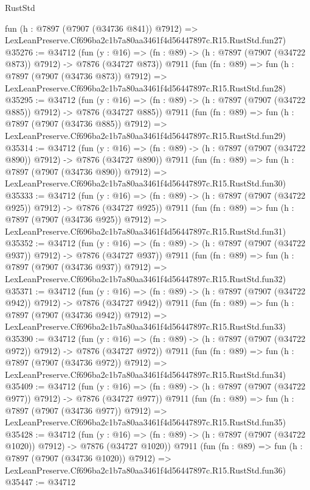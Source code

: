 \begin{lexlean}{RustStd}
\begin{coremodule}
    fun (h : @7897 (@7907 (@34736 @841)) @7912) =>
    LexLeanPreserve.Cf696ba2c1b7a80aa3461f4d56447897c.R15.RustStd.fun27)
@35276 := @34712
    (fun (y : @16) => (fn : @89) -> (h : @7897 (@7907 (@34722 @873)) @7912) -> @7876 (@34727 @873))
    @7911
    (fun (fn : @89) =>
    fun (h : @7897 (@7907 (@34736 @873)) @7912) =>
    LexLeanPreserve.Cf696ba2c1b7a80aa3461f4d56447897c.R15.RustStd.fun28)
@35295 := @34712
    (fun (y : @16) => (fn : @89) -> (h : @7897 (@7907 (@34722 @885)) @7912) -> @7876 (@34727 @885))
    @7911
    (fun (fn : @89) =>
    fun (h : @7897 (@7907 (@34736 @885)) @7912) =>
    LexLeanPreserve.Cf696ba2c1b7a80aa3461f4d56447897c.R15.RustStd.fun29)
@35314 := @34712
    (fun (y : @16) => (fn : @89) -> (h : @7897 (@7907 (@34722 @890)) @7912) -> @7876 (@34727 @890))
    @7911
    (fun (fn : @89) =>
    fun (h : @7897 (@7907 (@34736 @890)) @7912) =>
    LexLeanPreserve.Cf696ba2c1b7a80aa3461f4d56447897c.R15.RustStd.fun30)
@35333 := @34712
    (fun (y : @16) => (fn : @89) -> (h : @7897 (@7907 (@34722 @925)) @7912) -> @7876 (@34727 @925))
    @7911
    (fun (fn : @89) =>
    fun (h : @7897 (@7907 (@34736 @925)) @7912) =>
    LexLeanPreserve.Cf696ba2c1b7a80aa3461f4d56447897c.R15.RustStd.fun31)
@35352 := @34712
    (fun (y : @16) => (fn : @89) -> (h : @7897 (@7907 (@34722 @937)) @7912) -> @7876 (@34727 @937))
    @7911
    (fun (fn : @89) =>
    fun (h : @7897 (@7907 (@34736 @937)) @7912) =>
    LexLeanPreserve.Cf696ba2c1b7a80aa3461f4d56447897c.R15.RustStd.fun32)
@35371 := @34712
    (fun (y : @16) => (fn : @89) -> (h : @7897 (@7907 (@34722 @942)) @7912) -> @7876 (@34727 @942))
    @7911
    (fun (fn : @89) =>
    fun (h : @7897 (@7907 (@34736 @942)) @7912) =>
    LexLeanPreserve.Cf696ba2c1b7a80aa3461f4d56447897c.R15.RustStd.fun33)
@35390 := @34712
    (fun (y : @16) => (fn : @89) -> (h : @7897 (@7907 (@34722 @972)) @7912) -> @7876 (@34727 @972))
    @7911
    (fun (fn : @89) =>
    fun (h : @7897 (@7907 (@34736 @972)) @7912) =>
    LexLeanPreserve.Cf696ba2c1b7a80aa3461f4d56447897c.R15.RustStd.fun34)
@35409 := @34712
    (fun (y : @16) => (fn : @89) -> (h : @7897 (@7907 (@34722 @977)) @7912) -> @7876 (@34727 @977))
    @7911
    (fun (fn : @89) =>
    fun (h : @7897 (@7907 (@34736 @977)) @7912) =>
    LexLeanPreserve.Cf696ba2c1b7a80aa3461f4d56447897c.R15.RustStd.fun35)
@35428 := @34712
    (fun (y : @16) =>
    (fn : @89) -> (h : @7897 (@7907 (@34722 @1020)) @7912) -> @7876 (@34727 @1020))
    @7911
    (fun (fn : @89) =>
    fun (h : @7897 (@7907 (@34736 @1020)) @7912) =>
    LexLeanPreserve.Cf696ba2c1b7a80aa3461f4d56447897c.R15.RustStd.fun36)
@35447 := @34712

\end{coremodule}
\end{lexlean}
